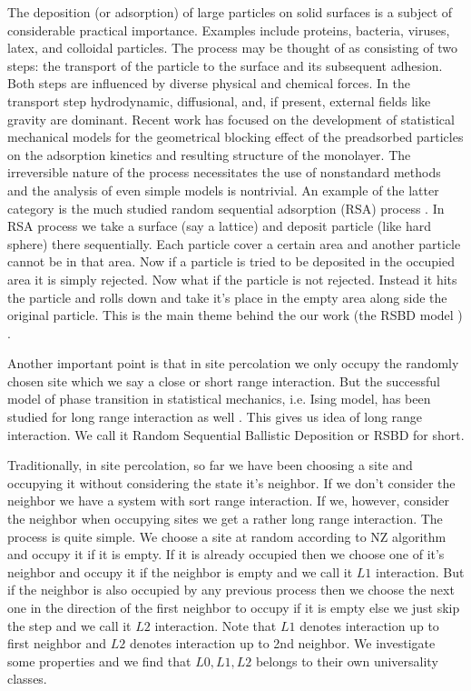	
	The deposition (or adsorption) of large particles on	solid surfaces is a subject of considerable practical importance. Examples include proteins, bacteria, viruses, latex,	and colloidal particles. The process may be thought of as	consisting of two steps: the transport of the particle to
	the surface and its subsequent adhesion. Both steps are	influenced by diverse physical and chemical forces. In	the transport step hydrodynamic, diffusional, and, if	present, external fields like gravity are dominant. Recent	work has focused on the development of statistical	mechanical models for the geometrical blocking effect of	the preadsorbed particles on the adsorption kinetics and
	resulting structure of the monolayer. The irreversible nature of the process necessitates the use of nonstandard	methods and the analysis of even simple models is nontrivial. An example of the latter category is the much	studied random sequential adsorption (RSA) process \cite{Talbot1992, Renyi1958, Widom1966}. In RSA process we take a surface (say a lattice) and deposit particle (like hard sphere) there sequentially. Each particle cover a certain area and another particle cannot be in that area. Now if a particle is tried to be deposited in the occupied area it is simply rejected.	Now what if	the particle is not rejected. Instead it hits the particle and rolls down and take it's place in the empty area along side the original particle. This is the main theme behind the our work (the RSBD model \cite{Talbot1992}) .
	
	
	Another important point is that in site percolation we only occupy the randomly chosen site which we say a close or short range interaction. But the successful model of phase transition in statistical mechanics, i.e. Ising model, has been studied for long range interaction as well \cite{Hiley1965, Cannas1995}. This gives us idea of long range interaction. We call it Random Sequential Ballistic Deposition or RSBD for short.
	
	Traditionally, in site percolation, so far we have been choosing a site and occupying it without considering the state it's neighbor. If we don't consider the neighbor we have a system with sort range interaction. If we, however, consider the neighbor when occupying sites we get a rather long range interaction. The process is quite simple. We choose a site at random according to NZ algorithm and occupy it if it is empty. If it is already occupied then we choose one of it's neighbor and occupy it if the neighbor is empty and we call it $L1$ interaction. But if the neighbor is also occupied by any previous process then we choose the next one in the direction of the first neighbor to occupy if it is empty else we just skip the step and we call it $L2$ interaction. Note that $L1$ denotes interaction up to first neighbor and $L2$ denotes interaction up to 2nd neighbor.  We investigate some properties and we find that $L0, L1, L2$ belongs to their own universality classes.
	

